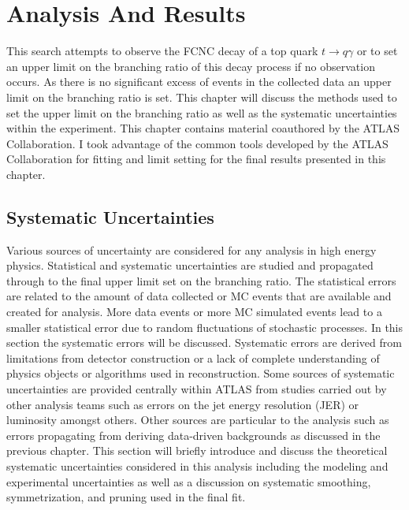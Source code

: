 
\chapter{Analysis And Results}
\label{ch:Results}
This search attempts to observe the FCNC decay of a top quark $t \rightarrow q \gamma$ or to set an upper limit on the branching ratio of this decay process if no observation occurs.  As there is no significant excess of events in the collected data an upper limit on the branching ratio is set.  This chapter will discuss  the methods used to set the upper limit on the branching ratio as well as the systematic uncertainties within the experiment.   This chapter contains material coauthored by the ATLAS Collaboration.  I took advantage of the common tools developed by the ATLAS Collaboration for fitting and limit setting for the final results presented in this chapter.

\section{Systematic Uncertainties}
\label{sec:NPUncertainties}
Various sources of uncertainty are considered for any analysis in high energy physics.  Statistical and systematic uncertainties are studied and propagated through to the final upper limit set on the branching ratio.  The statistical errors are related to the amount of data collected or MC events that are available and created for analysis.  More data events or more MC simulated events lead to a smaller statistical error due to random fluctuations of stochastic processes.  In this section the systematic errors will be discussed.  Systematic errors are derived from limitations from detector construction or a lack of complete understanding of physics objects or algorithms used in reconstruction.  Some sources of systematic uncertainties are provided centrally within ATLAS from studies carried out by other analysis teams such as errors on the jet energy resolution (JER) or luminosity amongst others. Other sources are particular to the analysis such as errors propagating from deriving data-driven backgrounds as discussed in the previous chapter.
This section will briefly introduce and discuss the theoretical systematic uncertainties considered in this analysis including the modeling and experimental uncertainties as well as a discussion on systematic smoothing, symmetrization, and pruning used in the final fit. 

